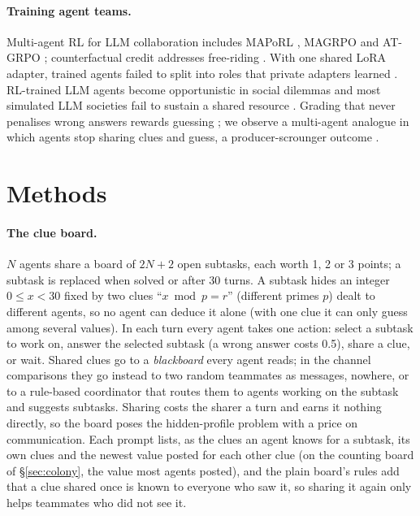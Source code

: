 \documentclass{article}
\begin{document}
\paragraph{Training agent teams.} Multi-agent RL for LLM collaboration includes MAPoRL \citep{park2025maporl}, MAGRPO \citep{liu2026magrpo} and AT-GRPO \citep{atgrpo2025}; counterfactual credit addresses free-riding \citep{li2026ccpo,foerster2018coma}. With one shared LoRA adapter, trained agents failed to split into roles that private adapters learned \citep{mao2026pamagrpo}. RL-trained LLM agents become opportunistic in social dilemmas \citep{piche2025robust} and most simulated LLM societies fail to sustain a shared resource \citep{piatti2024govsim}. Grading that never penalises wrong answers rewards guessing \citep{kalai2025hallucinate}; we observe a multi-agent analogue in which agents stop sharing clues and guess, a producer-scrounger outcome \citep{barnard1981producers}.

\section{Methods}
\label{sec:methods}

\paragraph{The clue board.} $N$ agents share a board of $2N+2$ open subtasks, each worth 1, 2 or 3 points; a subtask is replaced when solved or after 30 turns. A subtask hides an integer $0 \le x < 30$ fixed by two clues ``$x \bmod p = r$'' (different primes $p$) dealt to different agents, so no agent can deduce it alone (with one clue it can only guess among several values). In each turn every agent takes one action: select a subtask to work on, answer the selected subtask (a wrong answer costs 0.5), share a clue, or wait. Shared clues go to a \emph{blackboard} every agent reads; in the channel comparisons they go instead to two random teammates as messages, nowhere, or to a rule-based coordinator that routes them to agents working on the subtask and suggests subtasks. Sharing costs the sharer a turn and earns it nothing directly, so the board poses the hidden-profile problem with a price on communication. Each prompt lists, as the clues an agent knows for a subtask, its own clues and the newest value posted for each other clue (on the counting board of \S\ref{sec:colony}, the value most agents posted), and the plain board's rules add that a clue shared once is known to everyone who saw it, so sharing it again only helps teammates who did not see it.
\end{document}
